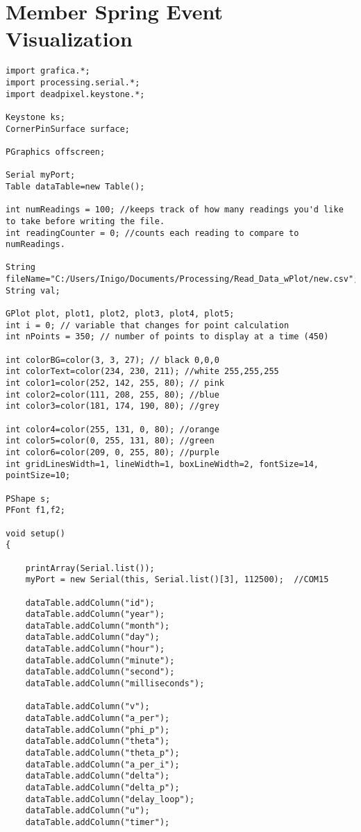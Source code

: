 \section{Member Spring Event Visualization}
\begin{lstlisting}[style=codejava]
import grafica.*;
import processing.serial.*;
import deadpixel.keystone.*;

Keystone ks;
CornerPinSurface surface;

PGraphics offscreen;

Serial myPort; 
Table dataTable=new Table();

int numReadings = 100; //keeps track of how many readings you'd like to take before writing the file. 
int readingCounter = 0; //counts each reading to compare to numReadings. 

String fileName="C:/Users/Inigo/Documents/Processing/Read_Data_wPlot/new.csv";
String val;

GPlot plot, plot1, plot2, plot3, plot4, plot5;
int i = 0; // variable that changes for point calculation
int nPoints = 350; // number of points to display at a time (450)

int colorBG=color(3, 3, 27); // black 0,0,0
int colorText=color(234, 230, 211); //white 255,255,255
int color1=color(252, 142, 255, 80); // pink
int color2=color(111, 208, 255, 80); //blue
int color3=color(181, 174, 190, 80); //grey

int color4=color(255, 131, 0, 80); //orange
int color5=color(0, 255, 131, 80); //green
int color6=color(209, 0, 255, 80); //purple
int gridLinesWidth=1, lineWidth=1, boxLineWidth=2, fontSize=14, pointSize=10;

PShape s;
PFont f1,f2;

void setup()
{

	printArray(Serial.list());
	myPort = new Serial(this, Serial.list()[3], 112500);  //COM15
	
	dataTable.addColumn("id");
	dataTable.addColumn("year");
	dataTable.addColumn("month");
	dataTable.addColumn("day");
	dataTable.addColumn("hour");
	dataTable.addColumn("minute");
	dataTable.addColumn("second");
	dataTable.addColumn("milliseconds");
	
	dataTable.addColumn("v");
	dataTable.addColumn("a_per");
	dataTable.addColumn("phi_p");
	dataTable.addColumn("theta");
	dataTable.addColumn("theta_p");
	dataTable.addColumn("a_per_i");
	dataTable.addColumn("delta");
	dataTable.addColumn("delta_p");
	dataTable.addColumn("delay_loop");
	dataTable.addColumn("u");
	dataTable.addColumn("timer");
	

\end{lstlisting}
